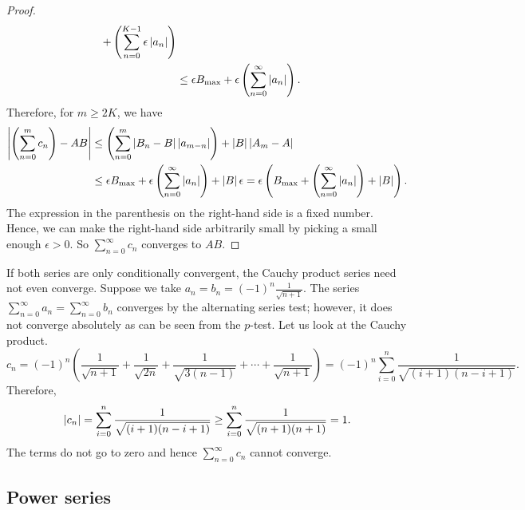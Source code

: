 \begin{proof}
\begin{equation*}
\begin{split}
+
\left(
\sum_{n=0}^{K-1}
  \epsilon \left\lvert {a_{n}} \right\rvert
\right)
\\
& \leq
\epsilon
B_{\text{max}}
+
\epsilon
\left(
\sum_{n=0}^\infty \left\lvert {a_{n}} \right\rvert
\right) .
\end{split}
\end{equation*}
Therefore, for $m \geq 2K$, we have
\begin{equation*}
\begin{split}
\left\lvert {\left(\sum_{n=0}^m c_n \right) - AB} \right\rvert
& \leq
\left(
\sum_{n=0}^m
  \left\lvert { B_n -  B } \right\rvert \left\lvert {a_{m-n}} \right\rvert
\right)
+
\left\lvert {B} \right\rvert\left\lvert {A_m - A} \right\rvert
\\
& \leq
\epsilon
B_{\text{max}}
+
\epsilon
\left(
\sum_{n=0}^\infty \left\lvert {a_{n}} \right\rvert
\right)
+
\left\lvert {B} \right\rvert\epsilon
=
\epsilon 
\left(
B_{\text{max}}
+
\left(
\sum_{n=0}^\infty \left\lvert {a_{n}} \right\rvert
\right)
+
\left\lvert {B} \right\rvert
\right) .
\end{split}
\end{equation*}
The expression in the parenthesis on the right-hand side
is a fixed number.
Hence,
we can make the right-hand side arbitrarily small by picking a small enough
$\epsilon> 0$.  So $\sum_{n=0}^\infty c_n$ converges to $AB$.
\end{proof}

\begin{example}
If both series are only conditionally convergent, the Cauchy product series
need not even converge.
Suppose we take $a_n = b_n = {(-1)}^n \frac{1}{\sqrt{n+1}}$.
The series $\sum_{n=0}^\infty a_n = \sum_{n=0}^\infty b_n$
converges
by the alternating series test; however, it does not converge
absolutely as can be seen from the $p$-test.  Let us look
at the Cauchy product.
\begin{equation*}
c_n = 
{(-1)}^n
\left(
\frac{1}{\sqrt{n+1}} + 
\frac{1}{\sqrt{2n}} + 
\frac{1}{\sqrt{3(n-1)}} + \cdots +
\frac{1}{\sqrt{n+1}}
\right)
=
{(-1)}^n
\sum_{i=0}^n \frac{1}{\sqrt{(i+1)(n-i+1)}} .
\end{equation*}
Therefore,
\begin{equation*}
\left\lvert {c_n} \right\rvert 
=
\sum_{i=0}^n \frac{1}{\sqrt{(i+1)(n-i+1)}} 
\geq
\sum_{i=0}^n \frac{1}{\sqrt{(n+1)(n+1)}} 
= 1 .
\end{equation*}
The terms do not go to zero and hence $\sum_{n=0}^\infty c_n$ cannot converge.
\end{example}

\subsection{Power series}

